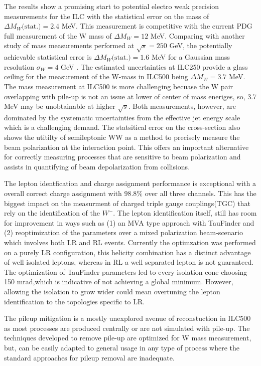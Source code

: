The results show a promising start to potential electro weak precision measurements for the ILC with the statistical error on the mass of $\Delta M_W\text{(stat.)}= 2.4$ MeV. This measurement is competitive with the current PDG full measurement of the W mass  of $\Delta M_W=12$ MeV.   Comparing with another study of mass measurements performed at $\sqrt{s} = 250$ GeV, the potentially achievable statistical error is $\Delta M_W\text{(stat.)} = 1.6$ MeV for a Gaussian mass resolution $\sigma_W= 4$ GeV \cite{graham}. The estimated uncertainties at ILC250 provide a glass ceiling for the measurement of the W-mass in ILC500 being $\Delta M_W =3.7$ MeV. The mass measurement at ILC500 is more challenging becuase the W pair overlapping with pile-up is not an issue at lower of center of mass eneriges, so, 3.7 MeV may be unobtainable at higher $\sqrt{s}$. Both measurements, however, are dominated by the systematic uncertainties from the effective jet energy scale which is a challenging demand.  The statsitical error on the cross-section also shows the utitilty of semileptonic WW as a method to precisely measure the beam polarization at the interaction point. This offers an important alternative for  correctly measuring processes that are sensitive to beam polarization and assists in quantifying of beam depolarization from collisions.

The lepton identfication and charge assignment performance is exceptional with a overall correct charge assignment with $98.8\%$ over all three channels. This has the biggest impact on the measurment of charged triple gauge couplings(TGC) that rely on the identification of the $W^-$. The lepton identification itself, still has room for improvement in ways such as (1) an MVA type approach with TauFinder and (2) reoptimization of the parameters over a mixed polarization beam-scenario which involves both LR and RL events. Currently the optimzation was performed on a purely LR configuration, this helicity combination has a distinct advantage of well isolated leptons, whereas in RL a well separated lepton is not guaranteed. The optimization of TauFinder parameters led to every isolation cone choosing 150 mrad,which is indicative of not achieving a global minimum. However, allowing the isolation to grow wider could mean overtuning the lepton identification to the topologies specific to LR. 

The pileup mitigation is a mostly unexplored avenue of reconstuction in ILC500 as most processes are produced centrally or are not simulated with pile-up. The techniques developed to remove pile-up are optimized for W mass measurement, but, can be easily adapted to general usage in any type of process where the standard approaches for pileup removal are inadequate. 

